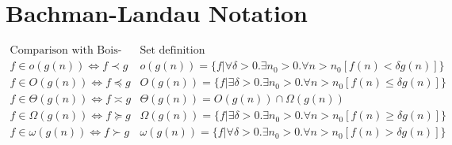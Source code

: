 \documentclass{report}
\begin{document}
\section*{Bachman-Landau Notation}
\[\begin{matrix}
		\text{Comparison with Bois-Reymond}                  & \text{Set definition}                                                                               \\
		f \in o(g(n)) \Leftrightarrow f \prec g              & o(g(n)) = \{f | \forall \delta > 0. \exists n_0 > 0.\forall n > n_0 [f(n) < \delta g(n)]\}          \\
		f \in O(g(n)) \Leftrightarrow f \preccurlyeq g       & O(g(n)) = \{f | \exists \delta > 0. \exists n_0 > 0.\forall n > n_0 [f(n) \leq \delta g(n)]\}       \\
		f \in \Theta (g(n)) \Leftrightarrow f \asymp g       & \Theta (g(n)) = O(g(n)) \cap \Omega(g(n))                                                           \\
		f \in \Omega (g(n)) \Leftrightarrow f \succcurlyeq g & \Omega (g(n)) = \{f | \exists \delta > 0. \exists n_0 > 0.\forall n > n_0 [f(n) \geq \delta g(n)]\} \\
		f \in \omega (g(n)) \Leftrightarrow f \succ g        & \omega (g(n)) = \{f | \forall \delta > 0. \exists n_0 > 0.\forall n > n_0 [f(n) > \delta g(n)]\}    \\
	\end{matrix}\]
\end{document}
